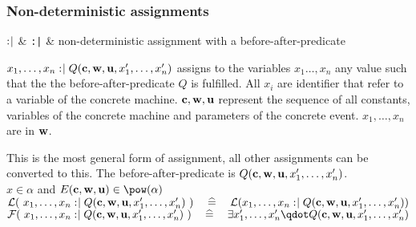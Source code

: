 \subsubsection{Non-deterministic assignments}
\label{nondeterministic_assignments}
\begin{rrnames}
  $\mathrel{:\mkern1mu\mid}$ & \texttt{:|} & non-deterministic assignment with a before-after-predicate
\end{rrnames}
\begin{rodinrefentry}
  \rrdesc
    $x_1,\ldots,x_n \mathrel{:\mkern1mu\mid} Q(\mathbf{c},\mathbf{w},\mathbf{u},x_1',\ldots,x_n')$
    assigns to the variables $x_1\ldots,x_n$ any value such that the the
    before-after-predicate $Q$ is fulfilled.
    All $x_i$ are identifier that refer to a variable of the concrete machine.
    $\mathbf{c},\mathbf{w},\mathbf{u}$ represent the sequence of all constants, 
    variables of the concrete machine and parameters of the concrete event.
    $x_1,\ldots,x_n$ are in $\mathbf{w}$.

    This is the most general form of assignment, all other assignments can be converted to this.
  \rrdef
    The before-after-predicate is $Q(\mathbf{c},\mathbf{w},\mathbf{u},x_1',\ldots,x_n')$. \\
  \rrtypes
    $x\in\alpha$ and $\eventbassignmentexpr{}\in\pow(\alpha)$
  \rrwd
    $\mathcal{L}(~x_1,\ldots,x_n \mathrel{:\mkern1mu\mid} Q(\mathbf{c},\mathbf{w},\mathbf{u},x_1',\ldots,x_n')~)
    \quad\mathrel{\widehat=}\quad
    \mathcal{L}(x_1,\ldots,x_n \mathrel{:\mkern1mu\mid} Q(\mathbf{c},\mathbf{w},\mathbf{u},x_1',\ldots,x_n'))$
  \rrfis
    $\actfis(~x_1,\ldots,x_n \bcmsuch Q(\allconstants,\concvariables,\concparameters,x_1',\ldots,x_n')~)
      \quad\defi\quad
      \exists x_1',\ldots,x_n' \qdot Q(\allconstants,\concvariables,\concparameters,x_1',\ldots,x_n')$
\end{rodinrefentry}

